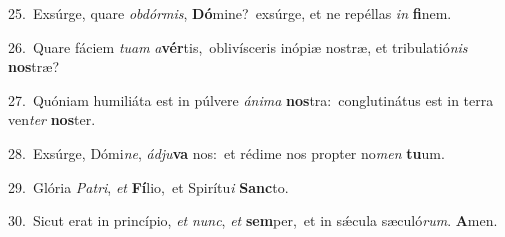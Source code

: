 {\numbfont\textcolor{\numbcolor}{25.}}~Exsúrge, quare \textit{ob}\-\textit{dór}\textit{mis}, \textbf{Dó}\-mine?~\star exsúrge, et ne repéllas \textit{in} \textbf{fi}\-nem.\par
{\numbfont\textcolor{\numbcolor}{26.}}~Quare fáciem \textit{tu}\-\textit{am} \textit{a}\-\textbf{vér}tis,~\star oblivísceris inópiæ nostræ, et tribulatió\textit{nis} \textbf{nos}\-træ?\par
{\numbfont\textcolor{\numbcolor}{27.}}~Quóniam humiliáta est in púlvere \textit{á}\-\textit{ni}\textit{ma} \textbf{nos}\-tra:~\star conglutinátus est in terra ven\textit{ter} \textbf{nos}\-ter.\par
{\numbfont\textcolor{\numbcolor}{28.}}~Exsúrge, Dómi\-\textit{ne}\-, \textit{ád}\-\textit{ju}\textbf{va} nos:~\star et rédime nos propter no\textit{men} \textbf{tu}\-um.\par
{\numbfont\textcolor{\numbcolor}{29.}}~Glória \textit{Pa}\-\textit{tri}, \textit{et} \textbf{Fí}\-lio,~\star et Spirítu\textit{i} \textbf{Sanc}\-to.\par
{\numbfont\textcolor{\numbcolor}{30.}}~Sicut erat in princípio, \textit{et} \textit{nunc}\-, \textit{et} \textbf{sem}\-per,~\star et in sǽcula sæculó\-\textit{rum}\-. \textbf{A}\-men.\par
